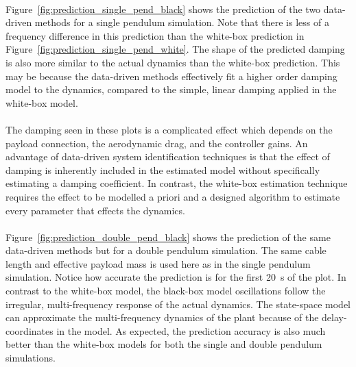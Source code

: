         
        

        \paragraph{}
        Figure~\ref{fig:prediction_single_pend_black} shows the prediction of the two data-driven methods
        for a single pendulum simulation.
        Note that there is less of a frequency difference in this prediction than the white-box prediction in 
        Figure~\ref{fig:prediction_single_pend_white}.
        The shape of the predicted damping is also more similar to the actual dynamics than the white-box prediction.
        This may be because the data-driven methods effectively fit a higher order damping model to the dynamics,
        compared to the simple, linear damping applied in the white-box model.

        \paragraph{}
        The damping seen in these plots is a complicated effect which depends on 
        the payload connection, 
        the aerodynamic drag, 
        and
        the controller gains.
        An advantage of data-driven system identification techniques 
        is that the effect of damping is inherently included in the estimated model 
        without specifically estimating a damping coefficient.
        In contrast, the white-box estimation technique requires the effect to be modelled a priori 
        and a designed algorithm to estimate every parameter that effects the dynamics.

                
        
        \paragraph{}
        Figure~\ref{fig:prediction_double_pend_black} shows the prediction of the same data-driven methods 
        but for a double pendulum simulation.
        The same cable length and effective payload mass is used here as in the single pendulum simulation.
        Notice how accurate the prediction is for the first \SI{20}{\second} of the plot.
        In contrast to the white-box model, the black-box model oscillations follow the irregular, 
        multi-frequency response of the actual dynamics.
        The state-space model can approximate the multi-frequency dynamics of the plant 
        because of the delay-coordinates in the model.
        As expected, the prediction accuracy is also much better than the white-box models 
        for both the single and double pendulum simulations. 

